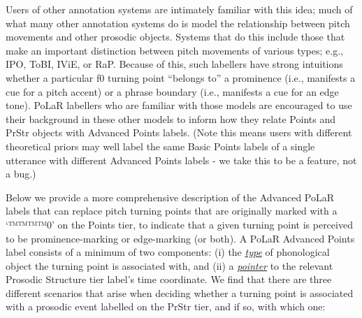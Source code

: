 \documentclass[11pt, twoside]{memoir}
\begin{document}
Users of other annotation systems are intimately familiar with this idea; much of what many other annotation systems do is model the relationship between pitch movements and other prosodic objects. Systems that do this include those that make an important distinction between pitch movements of various types; e.g., IPO, ToBI, IViE, or RaP. Because of this, such labellers have strong intuitions whether a particular f0 turning point “belongs to” a prominence (i.e., manifests a cue for a pitch accent) or a phrase boundary (i.e., manifests a cue for an edge tone). PoLaR labellers who are familiar with those models are encouraged to use their background in these other models to inform how they relate Points and PrStr objects with Advanced Points labels. (Note this means users with different theoretical priors may well label the same Basic Points labels of a single utterance with different Advanced Points labels - we take this to be a feature, not a bug.)

Below we provide a more comprehensive description of the Advanced PoLaR labels that can replace pitch turning points that are originally marked with a ‘™™™™{0}’ on the Points tier, to indicate that a given turning point is perceived to be prominence-marking or edge-marking (or both). A PoLaR Advanced Points label consists of a minimum of two components: (i) the \textit{\uline{type}} of phonological object the turning point is associated with, and (ii) a \textit{\uline{pointer}} to the relevant Prosodic Structure tier label’s time coordinate. We find that there are three different scenarios that arise when deciding whether a turning point is associated with a prosodic event labelled on the PrStr tier, and if so, with which one:
\end{document}
